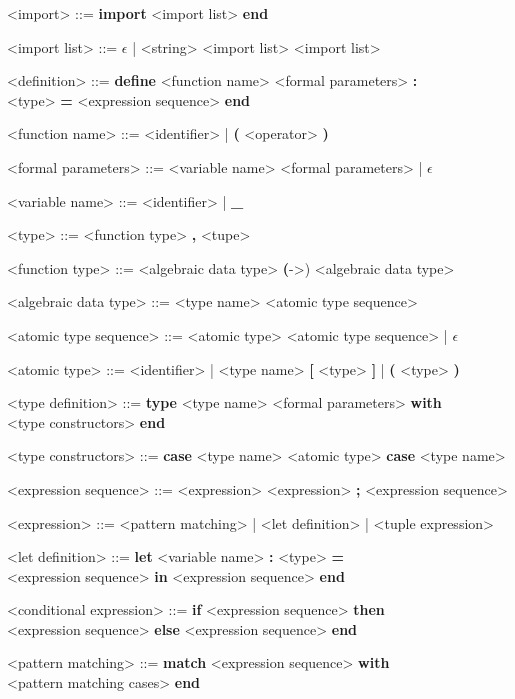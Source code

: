 \documentclass[12pt]{article}
\begin{document}
\begin{grammar}
<import> ::= \textbf{import} <import list> \textbf{end}

<import list> ::= $\epsilon$ | <string> <import list>
     <import list>

<definition> ::= \textbf{define} <function name> <formal parameters> 
    \textbf{:} \\<type> \textbf{=} <expression sequence> \textbf{end}

<function name> ::= <identifier> | \textbf{(} <operator> \textbf{)}

<formal parameters> ::= <variable name> <formal parameters> |  $\epsilon$

<variable name> ::= <identifier> | \textbf{_}

<type> ::= <function type>  \textbf{,} <tupe>

<function type> ::= <algebraic data type>
     \textbf(->) <algebraic data type> 

<algebraic data type> ::= <type name> <atomic type sequence>

<atomic type sequence> ::= <atomic type> <atomic type sequence> | $\epsilon$

<atomic type> ::= <identifier> | <type name>
    \alt \textbf{[} <type> \textbf{]} | \textbf{(} <type> \textbf{)}

<type definition> ::= \textbf{type} <type name> <formal parameters> \textbf{with}\\
    <type constructors> \textbf{end}

<type constructors> ::= \textbf{case} <type name> <atomic type>
    \alt \textbf{case} <type name>

<expression sequence> ::= <expression>
    \alt <expression> \textbf{;} <expression sequence>

<expression> ::= <pattern matching> | <let definition> 
     | <tuple expression>

<let definition> ::= \textbf{let} <variable name> \textbf{:} <type> \textbf{=}\\
    <expression sequence> \textbf{in} <expression sequence> \textbf{end}

<conditional expression> ::= \textbf{if} <expression sequence> \textbf{then} \\
    <expression sequence> \textbf {else} <expression sequence> \textbf{end}

<pattern matching> ::= \textbf{match} <expression sequence> \textbf{with} \\
    <pattern matching cases> \textbf{end}


\end{grammar}
\end{document}
